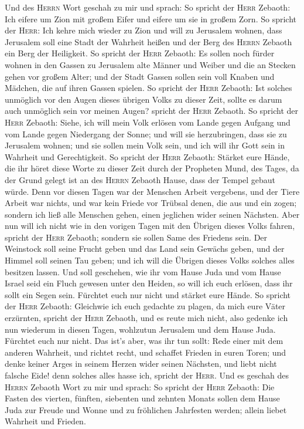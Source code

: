  Und des \textsc{Herrn} Wort geschah zu mir und sprach:
 So spricht der \textsc{Herr} Zebaoth: Ich eifere um Zion
mit großem Eifer und eifere um sie in großem Zorn.  So
spricht der \textsc{Herr}: Ich kehre mich wieder zu Zion und will zu
Jerusalem wohnen, dass Jerusalem soll eine Stadt der Wahrheit heißen und
der Berg des \textsc{Herrn} Zebaoth ein Berg der Heiligkeit.
 So spricht der \textsc{Herr} Zebaoth: Es sollen noch
fürder wohnen in den Gassen zu Jerusalem alte Männer und Weiber und die
an Stecken gehen vor großem Alter;  und der Stadt Gassen
sollen sein voll Knaben und Mädchen, die auf ihren Gassen spielen.
 So spricht der \textsc{Herr} Zebaoth: Ist solches
unmöglich vor den Augen dieses übrigen Volks zu dieser Zeit, sollte es
darum auch unmöglich sein vor meinen Augen? spricht der \textsc{Herr}
Zebaoth.  So spricht der \textsc{Herr} Zebaoth: Siehe, ich
will mein Volk erlösen vom Lande gegen Aufgang und vom Lande gegen
Niedergang der Sonne;  und will sie herzubringen, dass sie
zu Jerusalem wohnen; und sie sollen mein Volk sein, und ich will ihr
Gott sein in Wahrheit und Gerechtigkeit.  So spricht der
\textsc{Herr} Zebaoth: Stärket eure Hände, die ihr höret diese Worte zu
dieser Zeit durch der Propheten Mund, des Tages, da der Grund gelegt ist
an des \textsc{Herrn} Zebaoth Hause, dass der Tempel gebaut würde.
 Denn vor diesen Tagen war der Menschen Arbeit vergebens,
und der Tiere Arbeit war nichts, und war kein Friede vor Trübsal denen,
die aus und ein zogen; sondern ich ließ alle Menschen gehen, einen
jeglichen wider seinen Nächsten.  Aber nun will ich nicht
wie in den vorigen Tagen mit den Übrigen dieses Volks fahren, spricht
der \textsc{Herr} Zebaoth;  sondern sie sollen Same des
Friedens sein. Der Weinstock soll seine Frucht geben und das Land sein
Gewächs geben, und der Himmel soll seinen Tau geben; und ich will die
Übrigen dieses Volks solches alles besitzen lassen.  Und
soll geschehen, wie ihr vom Hause Juda und vom Hause Israel seid ein
Fluch gewesen unter den Heiden, so will ich euch erlösen, dass ihr sollt
ein Segen sein. Fürchtet euch nur nicht und stärket eure Hände.
 So spricht der \textsc{Herr} Zebaoth: Gleichwie ich euch
gedachte zu plagen, da mich eure Väter erzürnten, spricht der
\textsc{Herr} Zebaoth, und es reute mich nicht,  also
gedenke ich nun wiederum in diesen Tagen, wohlzutun Jerusalem und dem
Hause Juda. Fürchtet euch nur nicht.  Das ist's aber, was
ihr tun sollt: Rede einer mit dem anderen Wahrheit, und richtet recht,
und schaffet Frieden in euren Toren;  und denke keiner
Arges in seinem Herzen wider seinen Nächsten, und liebt nicht falsche
Eide! denn solches alles hasse ich, spricht der \textsc{Herr}.
 Und es geschah des \textsc{Herrn} Zebaoth Wort zu mir
und sprach:  So spricht der \textsc{Herr} Zebaoth: Die
Fasten des vierten, fünften, siebenten und zehnten Monats sollen dem
Hause Juda zur Freude und Wonne und zu fröhlichen Jahrfesten werden;
allein liebet Wahrheit und Frieden.

